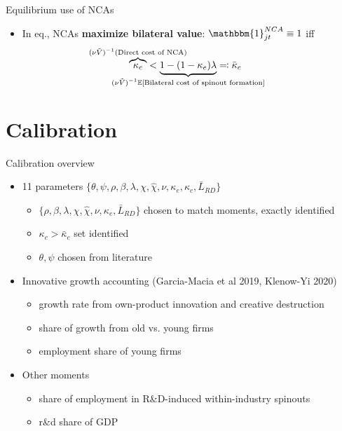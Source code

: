 \documentclass[english,usenames,dvipsnames]{beamer}
\begin{document}
\begin{frame}{Equilibrium use of NCAs}\label{use_of_ncas}
	\begin{itemize}
		\item In eq., NCAs \alert{\textbf{maximize bilateral value}}: $\mathbbm{1}^{NCA}_{jt} \equiv 1$ iff
		\begin{align*}
		\overbrace{\kappa_c}^{\mathclap{(\nu \tilde{V})^{-1} (\text{Direct cost of NCA})}} &< \underbrace{1 - (1-\kappa_e) \lambda}_{\mathclap{(\nu\tilde{V})^{-1}\mathbb{E}[\text{Bilateral cost of spinout formation}]}} \eqqcolon \bar{\kappa}_c
		\end{align*}
		\hyperlink{use_of_ncas_details}{}
	\end{itemize}
\end{frame}

\section{Calibration}


\begin{frame}
\tableofcontents[currentsection]
\end{frame}

\begin{frame}{Calibration overview}\label{calibration_overview}
	\begin{itemize}
		\item 11 parameters $\{\theta, \psi, \rho, \beta, \lambda , \chi, \hat{\chi}, \nu, \kappa_e, \kappa_c, \bar{L}_{RD} \}$
		\smallskip
		\begin{itemize}
			\item $\{\rho, \beta, \lambda ,\chi, \hat{\chi}, \nu, \kappa_e, \bar{L}_{RD} \}$ chosen to match moments, exactly identified
			\item $\kappa_c > \bar{\kappa}_{c}$ set identified
			\item $\theta, \psi$ chosen from literature
		\end{itemize}
		\medskip
		\item Innovative growth accounting (Garcia-Macia et al 2019, Klenow-Yi 2020)
		\begin{itemize}
			\item growth rate from own-product innovation and creative destruction
			\item share of growth from old vs. young firms
			\item employment share of young firms 
		\end{itemize}
		\medskip
		\item Other moments 
		\begin{itemize}
			\item share of employment in R\&D-induced within-industry spinouts	\hyperlink{economic_magnitude}{} 
			\item r\&d share of GDP
		\end{itemize}
	\end{itemize}
\end{frame}
\end{document}
